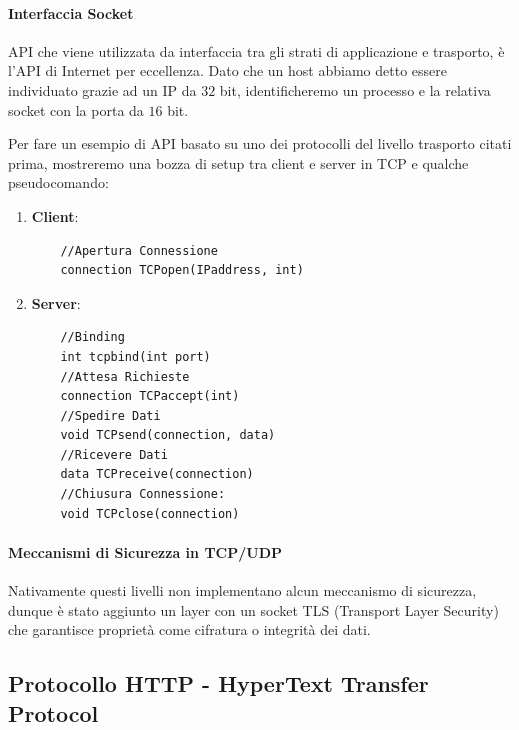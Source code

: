 \documentclass{article}
\begin{document}
\paragraph{Interfaccia Socket} API che viene utilizzata da interfaccia tra gli strati di applicazione e trasporto, è l'API di Internet per eccellenza. Dato che un host abbiamo
detto essere individuato grazie ad un IP da $32$ bit, identificheremo un processo e la relativa socket con la porta da $16$ bit.

\vspace*{15px}

Per fare un esempio di API basato su uno dei protocolli del livello trasporto citati prima, mostreremo una bozza di setup tra client e server in TCP e qualche pseudocomando:

\vspace*{15px}

\begin{enumerate}
    \item \textbf{Client}:
    \begin{lstlisting}
    //Apertura Connessione
    connection TCPopen(IPaddress, int)
    \end{lstlisting}
\newpage
    \item \textbf{Server}:
    \begin{lstlisting}
    //Binding
    int tcpbind(int port)
    //Attesa Richieste
    connection TCPaccept(int)
    //Spedire Dati
    void TCPsend(connection, data)
    //Ricevere Dati
    data TCPreceive(connection)
    //Chiusura Connessione:
    void TCPclose(connection)
    \end{lstlisting}
\end{enumerate}

\paragraph{Meccanismi di Sicurezza in TCP/UDP} Nativamente questi livelli non implementano alcun meccanismo di sicurezza, dunque è stato aggiunto un layer con un
socket TLS (Transport Layer Security) che garantisce proprietà come cifratura o integrità dei dati.

\vspace*{30px}

\subsection{Protocollo HTTP - HyperText Transfer Protocol}
\end{document}

